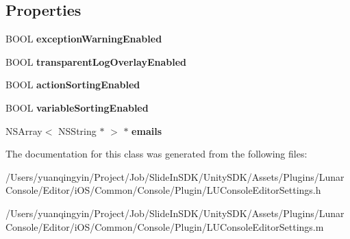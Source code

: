 \subsection*{Properties}
\begin{DoxyCompactItemize}
\item 
\mbox{\label{interface_l_u_console_editor_settings_a048aed8e30200ed5a51c51b770e3fbdf}} 
B\+O\+OL {\bfseries exception\+Warning\+Enabled}
\item 
\mbox{\label{interface_l_u_console_editor_settings_ac44eef9d3bdb6628de271ea1ed95bd9b}} 
B\+O\+OL {\bfseries transparent\+Log\+Overlay\+Enabled}
\item 
\mbox{\label{interface_l_u_console_editor_settings_a1ed0950b8912e6434669d40ae212ee00}} 
B\+O\+OL {\bfseries action\+Sorting\+Enabled}
\item 
\mbox{\label{interface_l_u_console_editor_settings_a89bd3473f98af4d78b9f298969c8d85a}} 
B\+O\+OL {\bfseries variable\+Sorting\+Enabled}
\item 
\mbox{\label{interface_l_u_console_editor_settings_ade922a105b9eba5513c1eb81310f800d}} 
N\+S\+Array$<$ N\+S\+String $\ast$ $>$ $\ast$ {\bfseries emails}
\end{DoxyCompactItemize}


The documentation for this class was generated from the following files\+:\begin{DoxyCompactItemize}
\item 
/\+Users/yuanqingyin/\+Project/\+Job/\+Slide\+In\+S\+D\+K/\+Unity\+S\+D\+K/\+Assets/\+Plugins/\+Lunar\+Console/\+Editor/i\+O\+S/\+Common/\+Console/\+Plugin/L\+U\+Console\+Editor\+Settings.\+h\item 
/\+Users/yuanqingyin/\+Project/\+Job/\+Slide\+In\+S\+D\+K/\+Unity\+S\+D\+K/\+Assets/\+Plugins/\+Lunar\+Console/\+Editor/i\+O\+S/\+Common/\+Console/\+Plugin/L\+U\+Console\+Editor\+Settings.\+m\end{DoxyCompactItemize}
